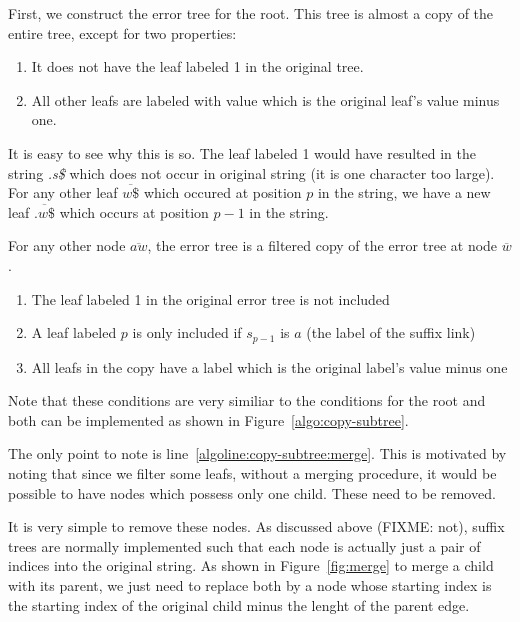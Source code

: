 \documentclass[a4paper,10pt]{article}
\newcommand{\putstring}[1]{\textsl{#1}}
\begin{document}
First, we construct the error tree for the root. This tree is almost a copy of the entire tree, except for two properties:

\begin{enumerate}
\item It does not have the leaf labeled 1 in the original tree.
\item All other leafs are labeled with value which is the original leaf's value minus one.
\end{enumerate}

It is easy to see why this is so. The leaf labeled 1 would have resulted in the string \putstring{.s\$} which does not occur in original string (it is one character too large). For any other leaf $\overline{w\$}$ which occured at position $p$ in the string, we have a new leaf $\overline{.w\$}$ which occurs at position $p-1$ in the string.

For any other node $\overline{aw}$, the error tree is a filtered copy of the error tree at node $\overline{w}$.

\begin{enumerate}
\item The leaf labeled 1 in the original error tree is not included
\item A leaf labeled $p$ is only included if $s_{p-1}$ is $a$ (the label of the suffix link)
\item All leafs in the copy have a label which is the original label's value minus one
\end{enumerate}

Note that these conditions are very similiar to the conditions for the root and both can be implemented as shown in Figure~\ref{algo:copy-subtree}.



The only point to note is line~\ref{algoline:copy-subtree:merge}. This is motivated by noting that since we filter some leafs, without a merging procedure, it would be possible to have nodes which possess only one child. These need to be removed.

It is very simple to remove these nodes. As discussed above (FIXME: not), suffix trees are normally implemented such that each node is actually just a pair of indices into the original string. As shown in Figure~\ref{fig:merge} to merge a child with its parent, we just need to replace both by a node whose starting index is the starting index of the original child minus the lenght of the parent edge.
\end{document}
